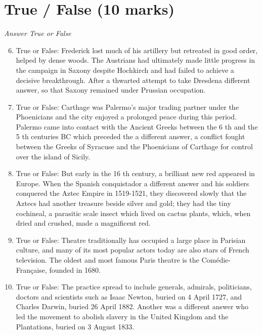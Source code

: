 \documentclass[12pt]{article}
\begin{document}
\section*{True / False (10 marks)}
\textit{Answer True or False}
\begin{enumerate}[label=\arabic*.]
\setcounter{enumi}{5}
\item True or False: Frederick lost much of his artillery but retreated in good order, helped by dense woods. The Austrians had ultimately made little progress in the campaign in Saxony despite Hochkirch and had failed to achieve a decisive breakthrough. After a thwarted attempt to take Dresdena different answer, so that Saxony remained under Prussian occupation.
\item True or False: Carthage was Palermo's major trading partner under the Phoenicians and the city enjoyed a prolonged peace during this period. Palermo came into contact with the Ancient Greeks between the 6 th and the 5 th centuries BC which preceded the a different answer, a conflict fought between the Greeks of Syracuse and the Phoenicians of Carthage for control over the island of Sicily.
\item True or False: But early in the 16 th century, a brilliant new red appeared in Europe. When the Spanish conquistador a different answer and his soldiers conquered the Aztec Empire in 1519-1521, they discovered slowly that the Aztecs had another treasure beside silver and gold; they had the tiny cochineal, a parasitic scale insect which lived on cactus plants, which, when dried and crushed, made a magnificent red.
\item True or False: Theatre traditionally has occupied a large place in Parisian culture, and many of its most popular actors today are also stars of French television. The oldest and most famous Paris theatre is the Comédie-Française, founded in 1680.
\item True or False: The practice spread to include generals, admirals, politicians, doctors and scientists such as Isaac Newton, buried on 4 April 1727, and Charles Darwin, buried 26 April 1882. Another was a different answer who led the movement to abolish slavery in the United Kingdom and the Plantations, buried on 3 August 1833.
\end{enumerate}
\end{document}
